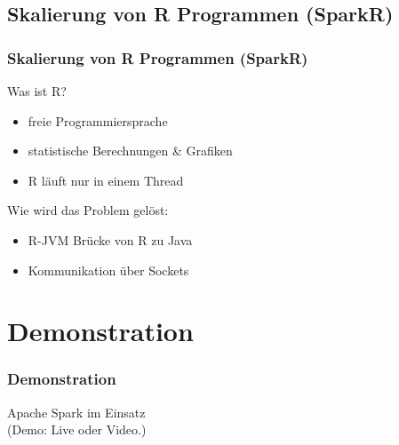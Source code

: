 \documentclass[hyperref={pdfpagelabels=false}]{beamer}
\begin{document}
\subsection{Skalierung von R Programmen (SparkR)}
\begin{frame} [t]
\frametitle{Skalierung von R Programmen (SparkR)}

	Was ist R?
	\begin{itemize}		
		\item freie Programmiersprache
		\item statistische Berechnungen \& Grafiken				
		\item R läuft nur in einem Thread
	\end{itemize}

Wie wird das Problem gelöst:
\begin{itemize}			
	\item R-JVM Brücke von R zu Java
	\item Kommunikation über Sockets 
\end{itemize}

 {
	\begin{figure}[h]
		\centering
	\end{figure}
}

\end{frame}



\section{Demonstration}
\begin{frame} [t]
\frametitle{Demonstration}

Apache Spark im Einsatz \\
\textcolor[rgb]{0.75,0.75,0.75}{(Demo: Live oder Video.)}

\end{frame}
\end{document}
